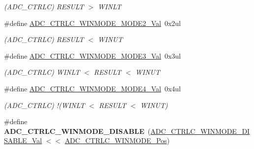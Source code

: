 \begin{DoxyCompactItemize}
\begin{DoxyCompactList}\small\item\em (A\+D\+C\+\_\+\+C\+T\+R\+L\+C) R\+E\+S\+U\+L\+T $>$ W\+I\+N\+L\+T \end{DoxyCompactList}\item 
\hypertarget{group___s_a_m_l21___a_d_c_ga0c11f6418ce8769e29ef3c56823c6445}{}\#define \hyperlink{group___s_a_m_l21___a_d_c_ga0c11f6418ce8769e29ef3c56823c6445}{A\+D\+C\+\_\+\+C\+T\+R\+L\+C\+\_\+\+W\+I\+N\+M\+O\+D\+E\+\_\+\+M\+O\+D\+E2\+\_\+\+Val}~0x2ul\label{group___s_a_m_l21___a_d_c_ga0c11f6418ce8769e29ef3c56823c6445}

\begin{DoxyCompactList}\small\item\em (A\+D\+C\+\_\+\+C\+T\+R\+L\+C) R\+E\+S\+U\+L\+T $<$ W\+I\+N\+U\+T \end{DoxyCompactList}\item 
\hypertarget{group___s_a_m_l21___a_d_c_ga51e227ad259e20ee67c222eef6b22354}{}\#define \hyperlink{group___s_a_m_l21___a_d_c_ga51e227ad259e20ee67c222eef6b22354}{A\+D\+C\+\_\+\+C\+T\+R\+L\+C\+\_\+\+W\+I\+N\+M\+O\+D\+E\+\_\+\+M\+O\+D\+E3\+\_\+\+Val}~0x3ul\label{group___s_a_m_l21___a_d_c_ga51e227ad259e20ee67c222eef6b22354}

\begin{DoxyCompactList}\small\item\em (A\+D\+C\+\_\+\+C\+T\+R\+L\+C) W\+I\+N\+L\+T $<$ R\+E\+S\+U\+L\+T $<$ W\+I\+N\+U\+T \end{DoxyCompactList}\item 
\hypertarget{group___s_a_m_l21___a_d_c_ga716a8e82c6c30c8d44143b74b2e2e4da}{}\#define \hyperlink{group___s_a_m_l21___a_d_c_ga716a8e82c6c30c8d44143b74b2e2e4da}{A\+D\+C\+\_\+\+C\+T\+R\+L\+C\+\_\+\+W\+I\+N\+M\+O\+D\+E\+\_\+\+M\+O\+D\+E4\+\_\+\+Val}~0x4ul\label{group___s_a_m_l21___a_d_c_ga716a8e82c6c30c8d44143b74b2e2e4da}

\begin{DoxyCompactList}\small\item\em (A\+D\+C\+\_\+\+C\+T\+R\+L\+C) !(W\+I\+N\+L\+T $<$ R\+E\+S\+U\+L\+T $<$ W\+I\+N\+U\+T) \end{DoxyCompactList}\item 
\hypertarget{group___s_a_m_l21___a_d_c_gab11590de75440bd611fe0f0e89563ba0}{}\#define {\bfseries A\+D\+C\+\_\+\+C\+T\+R\+L\+C\+\_\+\+W\+I\+N\+M\+O\+D\+E\+\_\+\+D\+I\+S\+A\+B\+L\+E}~(\hyperlink{group___s_a_m_l21___a_d_c_gaf0c4a29d6a07865f1d95046c1f1802de}{A\+D\+C\+\_\+\+C\+T\+R\+L\+C\+\_\+\+W\+I\+N\+M\+O\+D\+E\+\_\+\+D\+I\+S\+A\+B\+L\+E\+\_\+\+Val} $<$$<$ \hyperlink{group___s_a_m_l21___a_d_c_ga8a34af6e2a3244ddd1ffc8e1f6b78f42}{A\+D\+C\+\_\+\+C\+T\+R\+L\+C\+\_\+\+W\+I\+N\+M\+O\+D\+E\+\_\+\+Pos})\label{group___s_a_m_l21___a_d_c_gab11590de75440bd611fe0f0e89563ba0}


\end{DoxyCompactItemize}
